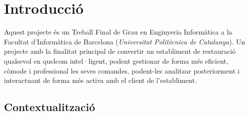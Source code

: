 
\chapter{Introducció} %

\label{Chapter1} %


\newcommand{\keyword}[1]{\textbf{#1}}
\newcommand{\tabhead}[1]{\textbf{#1}}
\newcommand{\code}[1]{\texttt{#1}}
\newcommand{\file}[1]{\texttt{\bfseries#1}}
\newcommand{\option}[1]{\texttt{\itshape#1}}


Aquest projecte és un Treball Final de Grau en Enginyeria Informàtica a la Facultat d'Informàtica de Barcelona (\textit{Universitat Politècnica de Catalunya}). Un projecte amb la finalitat principal de convertir un establiment de restauració qualsevol en quelcom intel·ligent, podent gestionar de forma més eficient, còmode i professional les seves comandes, podent-les analitzar posteriorment i interactuant de forma més activa amb el client de l'establiment.

\section{Contextualització}

